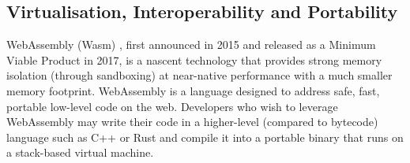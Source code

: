 
\subsection{Virtualisation, Interoperability and Portability}\label{sec:virtualization}


WebAssembly (Wasm) \cite{haas2017bringing}, first announced in 2015 and released as a Minimum Viable Product in 2017, is a nascent technology that provides strong memory isolation (through sandboxing) at near-native performance with a much smaller memory footprint. WebAssembly is a language designed to address safe, fast, portable low-level code on the web. Developers who wish to leverage WebAssembly may write their code in a higher-level (compared to bytecode) language such as C++ or Rust and compile it into a portable binary that runs on a stack-based virtual machine.




